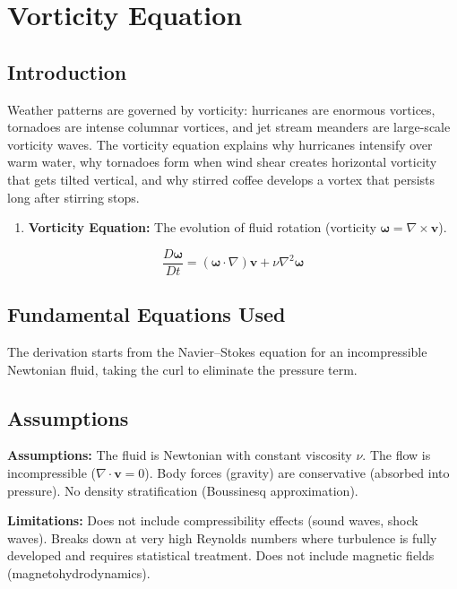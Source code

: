 \chapter{Vorticity Equation}

\section*{Introduction}

Weather patterns are governed by vorticity: hurricanes are enormous vortices, tornadoes are intense columnar vortices, and jet stream meanders are large-scale vorticity waves. The vorticity equation explains why hurricanes intensify over warm water, why tornadoes form when wind shear creates horizontal vorticity that gets tilted vertical, and why stirred coffee develops a vortex that persists long after stirring stops.

\begin{enumerate}
\item \textbf{Vorticity Equation:} The evolution of fluid rotation (vorticity $\boldsymbol{\omega} = \nabla \times \mathbf{v}$).

\end{enumerate}


\[
\frac{D\boldsymbol{\omega}}{Dt} = (\boldsymbol{\omega} \cdot \nabla)\mathbf{v} + \nu \nabla^2 \boldsymbol{\omega}
\]

\section*{Fundamental Equations Used}

The derivation starts from the Navier--Stokes equation for an incompressible Newtonian fluid, taking the curl to eliminate the pressure term.

\section*{Assumptions}

\textbf{Assumptions:} The fluid is Newtonian with constant viscosity $\nu$. The flow is incompressible ($\nabla \cdot \mathbf{v} = 0$). Body forces (gravity) are conservative (absorbed into pressure). No density stratification (Boussinesq approximation).


\textbf{Limitations:} Does not include compressibility effects (sound waves, shock waves). Breaks down at very high Reynolds numbers where turbulence is fully developed and requires statistical treatment. Does not include magnetic fields (magnetohydrodynamics).


